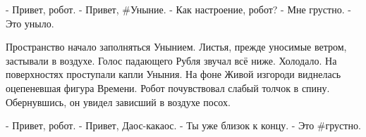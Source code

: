 - Привет, робот.
- Привет, #Уныние.
- Как настроение, робот?
- Мне грустно.
- Это уныло.

Пространство начало заполняться Унынием. Листья, прежде уносимые ветром, застывали в воздухе. Голос падающего Рубля звучал всё ниже. Холодало. На поверхностях проступали капли Уныния. На фоне Живой изгороди виднелась оцепеневшая фигура Времени. Робот почувствовал слабый толчок в спину. Обернувшись, он увидел зависший в воздухе посох.

- Привет, робот.
- Привет, Даос-какаос.
- Ты уже близок к концу.
- Это #грустно.
